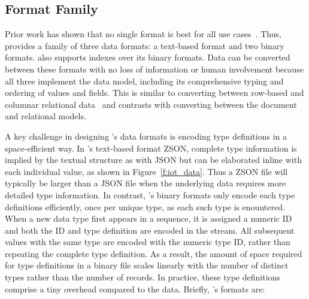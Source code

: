 

\subsection{\sys{} Format Family} \label{ss:zed_formats}

Prior work has shown that no single format is best for all use cases~. Thus, \sys{} provides a family of three data formats: a text-based format and two binary formats. \sys{} also supports indexes over its binary formats. Data can be converted between these formats with no loss of information or human involvement because all three implement the \sys{} data model, including its comprehensive typing and ordering of values and fields. This is similar to converting between row-based and columnar relational data~\cite{h2o, peloton} and contrasts with converting between the document and relational models.

A key challenge in designing \sys{}'s data formats is encoding type definitions in a space-efficient way. In \sys{}'s text-based format ZSON, complete type information is implied by the textual structure as with JSON but can be elaborated inline with each individual value, as shown in Figure~\ref{f:iot_data}. Thus a ZSON file will typically be larger than a JSON file when the underlying data requires more detailed type information. In contrast, \sys{}'s binary formats only encode each type definitions efficiently, once per unique type, as each such type is enountered. When a new data type first appears in a sequence, it is assigned a numeric ID and both the ID and type definition are encoded in the stream. All subsequent values with the same type are encoded with the numeric type ID, rather than repeating the complete type definition. As a result, the amount of space required for type definitions in a binary \sys{} file scales linearly with the number of distinct types rather than the number of records. In practice, these type definitions comprise a tiny overhead compared to the data.  Briefly, \sys{}'s formats are:

